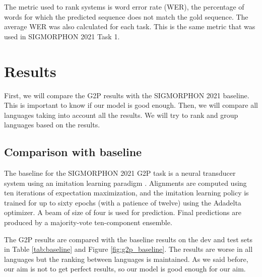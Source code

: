 \documentclass[11pt,a4paper]{article}
\begin{document}
The metric used to rank systems is word error rate (WER), the percentage of words for which the predicted sequence does not match the gold sequence. The average WER was also calculated for each task. This is the same metric that was used in SIGMORPHON 2021 Task 1.

\section{Results}

First, we will compare the G2P results with the SIGMORPHON 2021 baseline. This is important to know if our model is good enough. Then, we will compare all languages taking into account all the results. We will try to rank and group languages based on the results.

\subsection{Comparison with baseline}

The baseline for the SIGMORPHON 2021 G2P task is a neural transducer system using an imitation learning paradigm \cite{makarov-clematide-2018-imitation}. Alignments are computed using ten iterations of expectation maximization, and the imitation learning policy is trained for up to sixty epochs (with a patience of twelve) using the Adadelta optimizer. A beam of size of four is used for prediction. Final predictions are produced by a majority-vote ten-component ensemble.

The G2P results are compared with the baseline results on the dev and test sets in Table \ref{tab:baseline} and Figure \ref{fig:g2p_baseline}. The results are worse in all languages but the ranking between languages is maintained. As we said before, our aim is not to get perfect results, so our model is good enough for our aim.
\end{document}
